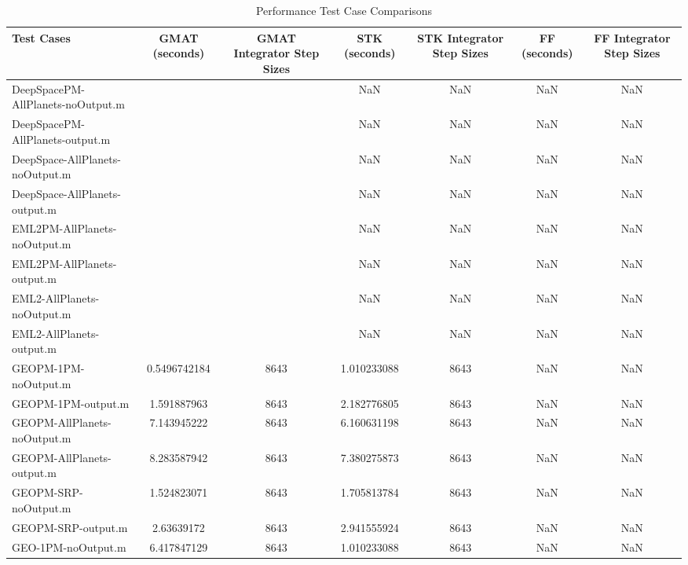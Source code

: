 \begin{table}[htbp!]
\centering
\caption{ Performance Test Case Comparisons}
      \begin{tabular}{lcccccc}
      \hline\hline
          Test Cases & GMAT (seconds) & GMAT Integrator Step Sizes & STK (seconds) & STK Integrator Step Sizes & FF (seconds) & FF Integrator Step Sizes \\
         \hline
         DeepSpacePM-AllPlanets-noOutput.m &  &  & NaN & NaN & NaN & NaN \\
         DeepSpacePM-AllPlanets-output.m &  &  & NaN & NaN & NaN & NaN \\
         DeepSpace-AllPlanets-noOutput.m &  &  & NaN & NaN & NaN & NaN \\
         DeepSpace-AllPlanets-output.m &  &  & NaN & NaN & NaN & NaN \\
         EML2PM-AllPlanets-noOutput.m &  &  & NaN & NaN & NaN & NaN \\
         EML2PM-AllPlanets-output.m &  &  & NaN & NaN & NaN & NaN \\
         EML2-AllPlanets-noOutput.m &  &  & NaN & NaN & NaN & NaN \\
         EML2-AllPlanets-output.m &  &  & NaN & NaN & NaN & NaN \\
         GEOPM-1PM-noOutput.m & 0.5496742184 & 8643 & 1.010233088 & 8643 & NaN & NaN \\
         GEOPM-1PM-output.m & 1.591887963 & 8643 & 2.182776805 & 8643 & NaN & NaN \\
         GEOPM-AllPlanets-noOutput.m & 7.143945222 & 8643 & 6.160631198 & 8643 & NaN & NaN \\
         GEOPM-AllPlanets-output.m & 8.283587942 & 8643 & 7.380275873 & 8643 & NaN & NaN \\
         GEOPM-SRP-noOutput.m & 1.524823071 & 8643 & 1.705813784 & 8643 & NaN & NaN \\
         GEOPM-SRP-output.m & 2.63639172 & 8643 & 2.941555924 & 8643 & NaN & NaN \\
         GEO-1PM-noOutput.m & 6.417847129 & 8643 & 1.010233088 & 8643 & NaN & NaN \\

\end{tabular}
\end{table}
